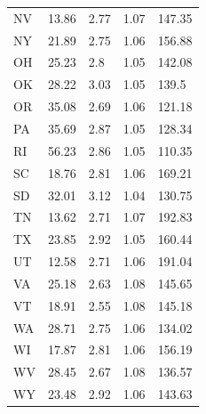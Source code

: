 \documentclass[Afour,sageh,times]{sagej}
\begin{document}
\begin{table}
\begin{tabular}{p{1in}p{1in}p{1in}p{1in}p{1in}}
	NV    & 13.86                       & 2.77                 & 1.07         & 147.35                    \\
	NY    & 21.89                       & 2.75                 & 1.06         & 156.88                    \\
	OH    & 25.23                       & 2.8                  & 1.05         & 142.08                    \\
	OK    & 28.22                       & 3.03                 & 1.05         & 139.5                     \\
	OR    & 35.08                       & 2.69                 & 1.06         & 121.18                    \\
	PA    & 35.69                       & 2.87                 & 1.05         & 128.34                    \\
	RI    & 56.23                       & 2.86                 & 1.05         & 110.35                    \\
	SC    & 18.76                       & 2.81                 & 1.06         & 169.21                    \\
	SD    & 32.01                       & 3.12                 & 1.04         & 130.75                    \\
	TN    & 13.62                       & 2.71                 & 1.07         & 192.83                    \\
	TX    & 23.85                       & 2.92                 & 1.05         & 160.44                    \\
	UT    & 12.58                       & 2.71                 & 1.06         & 191.04                    \\
	VA    & 25.18                       & 2.63                 & 1.08         & 145.65                    \\
	VT    & 18.91                       & 2.55                 & 1.08         & 145.18                    \\
	WA    & 28.71                       & 2.75                 & 1.06         & 134.02                    \\
	WI    & 17.87                       & 2.81                 & 1.06         & 156.19                    \\
	WV    & 28.45                       & 2.67                 & 1.08         & 136.57                    \\
	WY    & 23.48                       & 2.92                 & 1.06         & 143.63                    \\
	\bottomrule
\end{tabular}
\end{table}
\restoregeometry
\end{document}
